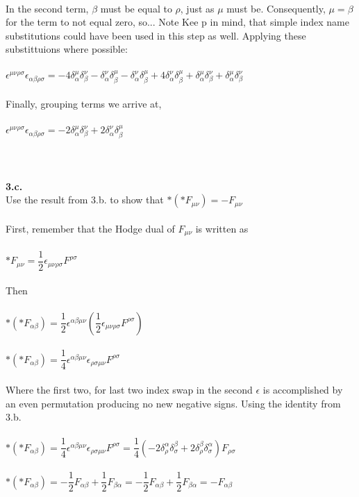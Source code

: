 \documentclass[prb,preprint]
{revtex4-1}
\newcommand{\PRLsep}{\noindent\makebox[\linewidth]{\resizebox{0.8888\linewidth}{2pt}{$\bullet$}}\bigskip}
\begin{document}
\\
In the second term, $\beta$ must be equal to $\rho$, just as $\mu$ must be.  Consequently, $\mu = \beta$ for the term to not equal zero, so...  Note Kee p in mind, that simple index name substitutions could have been used in this step as well.  Applying these substittuions where possible:
\\
\\
$\epsilon^{\mu\nu\rho\sigma}\epsilon_{\alpha\beta\rho\sigma} = -4\delta^\mu_\alpha \delta^\nu_\beta - \delta^\nu_\alpha \delta^\mu_\beta - \delta^\nu_\alpha \delta^\mu_\beta + 4\delta^\nu_\alpha \delta^\mu_\beta + \delta^\mu_\alpha \delta^\nu_\beta + \delta^\mu_\alpha \delta^\nu_\beta$
\\
\\
Finally, grouping terms we arrive at,
\\
\\
$\epsilon^{\mu\nu\rho\sigma}\epsilon_{\alpha\beta\rho\sigma} = -2\delta^\mu_\alpha \delta^\nu_\beta + 2\delta^\nu_\alpha \delta^\mu_\beta$
\\
\\
\PRLsep
\\
\\
\newpage
\textbf{3.c.}
\\
Use the result from 3.b. to show that $*\left(*F_{\mu\nu}\right) = -F_{\mu\nu}$
\\
\\
First, remember that the Hodge dual of $F_{\mu\nu}$ is written as 
\\
\\
$*F_{\mu\nu} = \dfrac{1}{2} \epsilon_{\mu\nu\rho\sigma} F^{\rho\sigma}$
\\
\\
Then
\\
\\
$*\left(*F_{\alpha\beta}\right) = \dfrac{1}{2} \epsilon^{\alpha\beta\mu\nu} \left(\dfrac{1}{2} \epsilon_{\mu\nu\rho\sigma} F^{\rho\sigma}\right)$
\\
\\
$*\left(*F_{\alpha\beta}\right) = \dfrac{1}{4} \epsilon^{\alpha\beta\mu\nu}\epsilon_{\rho\sigma\mu\nu} F^{\rho\sigma}$
\\
\\
Where the first two, for last two index swap in the second $\epsilon$ is accomplished by an even permutation producing no new negative signs.  Using the identity from 3.b.
\\
\\
$*\left(*F_{\alpha\beta}\right) = \dfrac{1}{4} \epsilon^{\alpha\beta\mu\nu}\epsilon_{\rho\sigma\mu\nu} F^{\rho\sigma} = \dfrac{1}{4} \left(-2\delta^\alpha_\rho \delta^\beta_\sigma + 2\delta^\beta_\rho \delta^\alpha_\sigma \right) F_{\rho\sigma}$
\\
\\
$*\left(*F_{\alpha\beta}\right) = -\dfrac{1}{2} F_{\alpha\beta} + \dfrac{1}{2} F_{\beta\alpha} = -\dfrac{1}{2} F_{\alpha\beta} + \dfrac{1}{2} F_{\beta\alpha} = -F_{\alpha\beta}$
\\
\\
\end{document}
